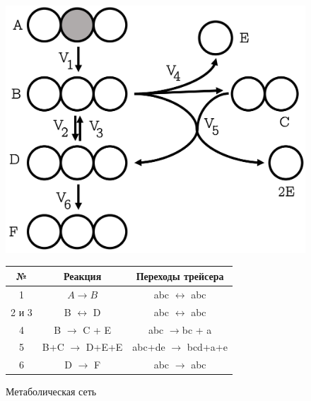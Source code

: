 \documentclass[14pt, a4paper]{extreport}
\begin{document}
\begin{figure}[b]
	\centering
	\begin{minipage}[l]{.5\textwidth}
		\centering
		\includegraphics[scale=0.11]{full_emu_map.png}
		\caption{Метаболическая сеть}
		\label{emu_example}
	\end{minipage}%
	\begin{minipage}[r]{.5\textwidth}
		\centering
		\small
		\begin{tabular}{c c c}
			\hline
			№ & Реакция & Переходы трейсера\\
			\hline
			1 & $A \to B$ & abc $\leftrightarrow$ abc\\
			2 и 3 & B $\leftrightarrow$ D & abc $\leftrightarrow$ abc\\
			4 & B $\to$ C + E & abc $\to$bc + a\\
			5 & B+C $\to$ D+E+E & abc+de $\to$ bcd+a+e\\
			6 & D $\to$ F & abc $\to$ abc\\
			\hline
		\end{tabular}
		\label{emu_example_table}
	\end{minipage}
\end{figure}
\end{document}
